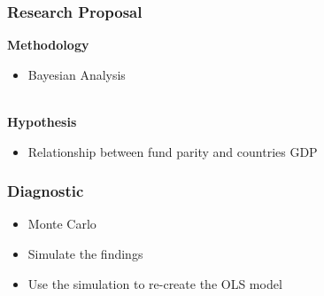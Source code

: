\documentclass{beamer}
\begin{document}
	

\begin{frame}
	\frametitle{Research Proposal} 
		\textbf{Methodology}
	\begin{itemize}
		\item{Bayesian Analysis} \\~\
	\end{itemize}
\textbf{Hypothesis} 
\begin{itemize}
		\item{Relationship between fund parity and countries GDP}
\end{itemize}
\end{frame}


\begin{frame}
	\frametitle{Diagnostic} 
	\begin{itemize}
		\item{Monte Carlo} \\
		\item{Simulate the findings} \\ 
		\item{Use the simulation to re-create the OLS model} \\ 
	\end{itemize}
\end{frame}
\end{document}
